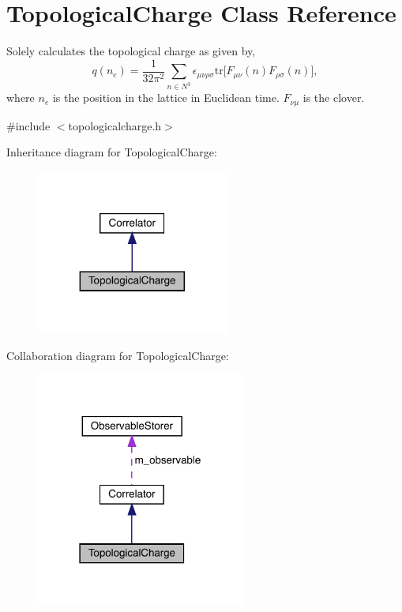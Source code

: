 \hypertarget{class_topological_charge}{}\section{Topological\+Charge Class Reference}
\label{class_topological_charge}


Solely calculates the topological charge as given by, \[ q(n_e) = \frac{1}{32\pi^2} \sum_{n \in N^3} \epsilon_{\mu\nu\rho\sigma} \mathrm{tr}\big[F_{\mu\nu}(n)F_{\rho\sigma}(n)\big], \] where $n_e$ is the position in the lattice in Euclidean time. $F_{\nu\mu}$ is the clover.  




{\ttfamily \#include $<$topologicalcharge.\+h$>$}



Inheritance diagram for Topological\+Charge\+:\nopagebreak
\begin{figure}[H]
\begin{center}
\leavevmode
\includegraphics[width=179pt]{class_topological_charge__inherit__graph}
\end{center}
\end{figure}


Collaboration diagram for Topological\+Charge\+:\nopagebreak
\begin{figure}[H]
\begin{center}
\leavevmode
\includegraphics[width=195pt]{class_topological_charge__coll__graph}
\end{center}
\end{figure}
